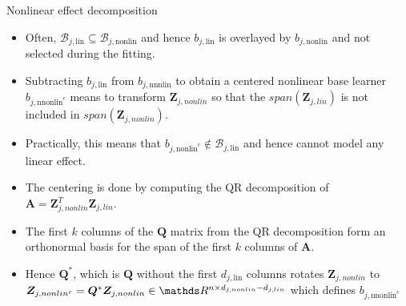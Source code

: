 \documentclass[11pt,compress,t,notes=noshow, xcolor=table]{beamer}
\begin{document}
\begin{vbframe}{Nonlinear effect decomposition}
\begin{itemize}
    \item
        Often, $\mathcal{B}_{j,\text{lin}} \subseteq \mathcal{B}_{j,\text{nonlin}}$ and hence $b_{j,\text{lin}}$ is overlayed by $b_{j,\text{nonlin}}$ and not selected during the fitting.

     \item
        Subtracting $b_{j,\text{lin}}$ from $b_{j,\text{nnnlin}}$ to obtain a centered nonlinear base learner $b_{j,\text{nnonlin}^c}$ means to transform $\bm{Z}_{j,nonlin}$ so that the $span(\bm{Z}_{j,lin})$ is not included in $span(\bm{Z}_{j,nonlin})$. 

    \item 
        Practically, this means that $b_{j,\text{nonlin}^c}\notin \mathcal{B}_{j,\text{lin}}$ and hence cannot model any linear effect.

    \item
        The centering is done by computing the QR decomposition of $\bm{A} = \bm{Z}_{j,nonlin}^T \bm{Z}_{j,lin}$.

    \item 
        The first $k$ columns of the $\bm{Q}$ matrix from the QR decomposition form an orthonormal basis for the span of the first $k$ columns of $\bm{A}$.

    \item 
        Hence $\bm{Q}^\ast$, which is $\bm{Q}$ without the first $d_{j,\text{lin}}$ columns rotates $\bm{Z}_{j,nonlin}$ to $\bm{Z}_{j,nonlin^c} = \bm{Q}^\ast\bm{Z}_{j,nonlin}\in\R^{n\times d_{j,nonlin} - d_{j,lin}}$ which defines $b_{j,\text{nnonlin}^c}$
\end{itemize}

\end{vbframe}
\end{document}
